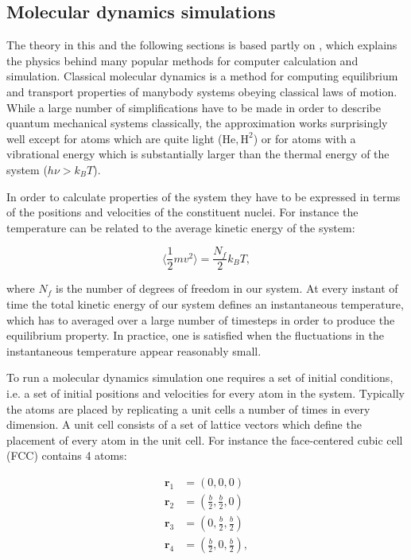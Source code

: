 \subsection{Molecular dynamics simulations}
The theory in this and the following sections
is based partly on \parencite[Frenkel, Daan
and Smit, Berend][pages 63-107]{frenkel2001understanding},
which explains the physics behind many popular methods 
for computer calculation and simulation.
Classical molecular dynamics is a method
for computing equilibrium and transport properties
of manybody systems obeying classical laws of motion.
While a large number of simplifications have to be made
in order to describe quantum mechanical systems classically,
the approximation works surprisingly well
except for atoms which are quite light ($\text{He}, \text{H}^2$)
or for atoms with a vibrational energy
which is substantially larger than the thermal energy
of the system ($h\nu > k_B T$).
\par
In order to calculate properties of the system
they have to be expressed in terms of the positions
and velocities of the constituent nuclei.
For instance the temperature can be related
to the average kinetic energy of the system:

$$ \langle \frac{1}{2} m v^2 \rangle = \frac{N_f}{2} k_B T , $$

where $N_f$ is the number of degrees of freedom in our system.
At every instant of time the total kinetic energy
of our system defines an instantaneous temperature,
which has to averaged over a large number of timesteps
in order to produce the equilibrium property.
In practice, one is satisfied when the fluctuations
in the instantaneous temperature appear reasonably small.
\par
To run a molecular dynamics simulation one requires
a set of initial conditions, i.e. a set of initial positions and velocities
for every atom in the system. Typically the atoms
are placed by replicating a unit cells a number of times
in every dimension. A unit cell consists of a set
of lattice vectors which define the placement of every atom in the
unit cell. For instance the face-centered cubic cell (FCC)
contains 4 atoms:

\begin{equation}
    \begin{split}
        \bm{r}_1 &= (0, 0, 0) \\
        \bm{r}_2 &= (\frac{b}{2}, \frac{b}{2}, 0) \\
        \bm{r}_3 &= (0, \frac{b}{2}, \frac{b}{2}) \\
        \bm{r}_4 &= (\frac{b}{2}, 0, \frac{b}{2}) , \\
    \end{split}
\end{equation}

